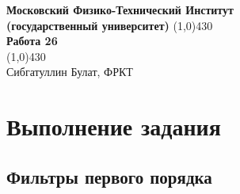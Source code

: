 \documentclass[a4paper, 12pt]{article}%
\begin{document}
\begin{titlepage}

\begin{center}
\large\textbf{Московский Физико-Технический Институт}\\
\large\textbf{(государственный университет)}
\vfill
\line(1,0){430}\\[1mm]
\huge\textbf{Работа 26}\\
\line(1,0){430}\\[1mm]
\vfill
\large Сибгатуллин Булат, ФРКТ\\
\end{center}

\end{titlepage}

\section{Выполнение задания}

\subsection{Фильтры первого порядка}
\end{document}
